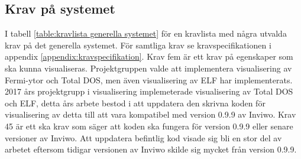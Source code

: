 \documentclass[a4paper,12pt]{article}
\begin{document}
\subsection{Krav på systemet}
I tabell \ref{table:kravlista generella systemet} för en kravlista med några utvalda krav på det generella systemet. För samtliga krav se kravspecifikationen i appendix \ref{appendix:kravspecifikation}. Krav fem är ett krav på egenskaper som ska kunna visualiseras. Projektgruppen valde att implementera visualisering av Fermi-ytor och Total DOS, men även visualisering av ELF har implementerats. 2017 års projektgrupp i visualisering implemeterade visualisering av Total DOS och ELF, detta års arbete bestod i att uppdatera den skrivna koden för visualisering av detta till att vara kompatibel med version 0.9.9 av Inviwo. Krav 45 är ett ska krav som säger att koden ska fungera för version 0.9.9 eller senare versioner av Inviwo. Att uppdatera befintlig kod visade sig bli en stor del av arbetet eftersom tidigar versionen av Inviwo skilde sig mycket från version 0.9.9.
 
\end{document}
